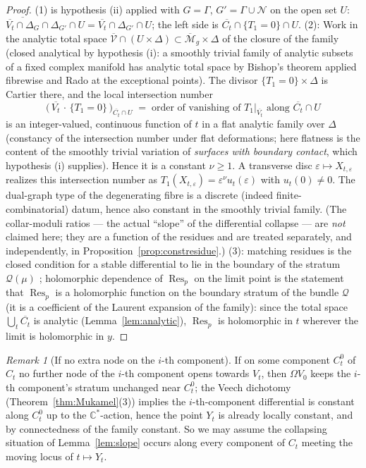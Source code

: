 \documentclass[11pt]{article}
\newcommand{\C}{\mathbb{C}}
\newcommand{\cQ}{\mathcal{Q}}
\newcommand{\M}{\mathcal{M}}
\DeclareMathOperator{\Res}{Res}
\theoremstyle{definition}
\theoremstyle{remark}
\newtheorem{rmk}[thm]{Remark}
\begin{document}
\begin{proof}
(1) is hypothesis (ii) applied with $G = \Gamma$, $G' =
\Gamma \cup \mathcal N$ on the open set $U$:
$\overline{\overline{V_t}\cap\Delta_{G}} \cap \Delta_{G'} \cap U
= \overline{V_t} \cap \Delta_{G'} \cap U$; the left side is
$\overline{C_t}\cap\{T_1 = 0\}\cap U$.
(2): Work in the analytic total space
$\overline{\mathcal V} \cap (U \times \Delta) \subset \overline{\M}_g
\times \Delta$ of the closure of the family (closed analytical by
hypothesis (i): a smoothly trivial family of analytic subsets of a fixed
complex manifold has analytic total space by Bishop's theorem applied
fibrewise and Rado at the exceptional points). The divisor
$\{T_1 = 0\} \times \Delta$ is Cartier there, and the local intersection
number
\[
\bigl(\,\overline{V_t}\,\cdot\,\{T_1 = 0\}\,\bigr)_{\overline{C_t}\cap U}
\;=\; \text{order of vanishing of } T_1|_{\overline{V_t}} \text{ along }
\overline{C_t} \cap U
\]
is an integer-valued, continuous function of $t$ in a flat analytic
family over $\Delta$ (constancy of the intersection number under flat
deformations; here flatness is the content of the smoothly trivial
variation of \emph{surfaces with boundary contact}, which hypothesis (i)
supplies). Hence it is a constant $\nu \ge 1$. A transverse disc
$\varepsilon \mapsto X_{t,\varepsilon}$ realizes this intersection
number as $T_1(X_{t,\varepsilon}) = \varepsilon^\nu u_t(\varepsilon)$
with $u_t(0) \neq 0$. The dual-graph type of the degenerating fibre is a
discrete (indeed finite-combinatorial) datum, hence also constant in the
smoothly trivial family. (The collar-moduli ratios --- the actual
``slope'' of the differential collapse --- are \emph{not} claimed here;
they are a function of the residues and are treated separately, and
independently, in Proposition~\ref{prop:constresidue}.)
(3): matching residues is the closed condition for a stable differential
to lie in the boundary of the stratum $\cQ(\mu)$
\cite{BCGGM}; holomorphic dependence of $\Res_p$ on the limit point is the
statement that $\Res_p$ is a holomorphic function on the boundary stratum
of the bundle $\cQ$ (it is a coefficient of the Laurent expansion of the
family): since the total space $\bigcup_t \overline{C_t}$ is analytic
(Lemma~\ref{lem:analytic}), $\Res_p$ is holomorphic in $t$ wherever the
limit is holomorphic in $y$.
\end{proof}

\begin{rmk}[If no extra node on the $i$-th
component]\label{rmk:nodegeneration}
If on some component $C_t^0$ of $C_t$ no further node of the $i$-th
component opens towards $V_t$, then $\Omega V_0$ keeps the $i$-th
component's stratum unchanged near $C_t^0$; the
Veech dichotomy (Theorem~\ref{thm:Mukamel}(3)) implies the
$i$-th-component differential is constant along $C_t^0$ up to the $\C^*$-action, hence the point $Y_t$ is
already locally constant, and by connectedness of the family constant. So
we may assume the collapsing situation of Lemma~\ref{lem:slope} occurs
along every component of $C_t$ meeting the moving locus of $t \mapsto Y_t$.
\end{rmk}
\end{document}
